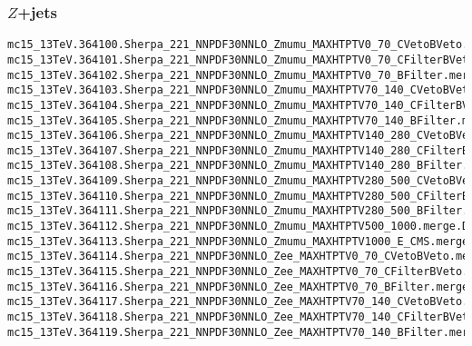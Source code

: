 \begin{scriptsize}
\subsubsection{$Z$+jets}
\tiny
\begin{verbatim}
mc15_13TeV.364100.Sherpa_221_NNPDF30NNLO_Zmumu_MAXHTPTV0_70_CVetoBVeto.merge.DAOD_HIGG5D2.e5271_s2726_r7772_r7676_p2949
mc15_13TeV.364101.Sherpa_221_NNPDF30NNLO_Zmumu_MAXHTPTV0_70_CFilterBVeto.merge.DAOD_HIGG5D2.e5271_s2726_r7772_r7676_p2949
mc15_13TeV.364102.Sherpa_221_NNPDF30NNLO_Zmumu_MAXHTPTV0_70_BFilter.merge.DAOD_HIGG5D2.e5271_s2726_r7772_r7676_p2949
mc15_13TeV.364103.Sherpa_221_NNPDF30NNLO_Zmumu_MAXHTPTV70_140_CVetoBVeto.merge.DAOD_HIGG5D2.e5271_s2726_r7772_r7676_p2949
mc15_13TeV.364104.Sherpa_221_NNPDF30NNLO_Zmumu_MAXHTPTV70_140_CFilterBVeto.merge.DAOD_HIGG5D2.e5271_s2726_r7772_r7676_p2949
mc15_13TeV.364105.Sherpa_221_NNPDF30NNLO_Zmumu_MAXHTPTV70_140_BFilter.merge.DAOD_HIGG5D2.e5271_s2726_r7772_r7676_p2949
mc15_13TeV.364106.Sherpa_221_NNPDF30NNLO_Zmumu_MAXHTPTV140_280_CVetoBVeto.merge.DAOD_HIGG5D2.e5271_s2726_r7772_r7676_p2949
mc15_13TeV.364107.Sherpa_221_NNPDF30NNLO_Zmumu_MAXHTPTV140_280_CFilterBVeto.merge.DAOD_HIGG5D2.e5271_s2726_r7772_r7676_p2949
mc15_13TeV.364108.Sherpa_221_NNPDF30NNLO_Zmumu_MAXHTPTV140_280_BFilter.merge.DAOD_HIGG5D2.e5271_s2726_r7772_r7676_p2949
mc15_13TeV.364109.Sherpa_221_NNPDF30NNLO_Zmumu_MAXHTPTV280_500_CVetoBVeto.merge.DAOD_HIGG5D2.e5271_s2726_r7772_r7676_p2949
mc15_13TeV.364110.Sherpa_221_NNPDF30NNLO_Zmumu_MAXHTPTV280_500_CFilterBVeto.merge.DAOD_HIGG5D2.e5271_s2726_r7772_r7676_p2949
mc15_13TeV.364111.Sherpa_221_NNPDF30NNLO_Zmumu_MAXHTPTV280_500_BFilter.merge.DAOD_HIGG5D2.e5271_s2726_r7772_r7676_p2949
mc15_13TeV.364112.Sherpa_221_NNPDF30NNLO_Zmumu_MAXHTPTV500_1000.merge.DAOD_HIGG5D2.e5271_s2726_r7772_r7676_p2949
mc15_13TeV.364113.Sherpa_221_NNPDF30NNLO_Zmumu_MAXHTPTV1000_E_CMS.merge.DAOD_HIGG5D2.e5271_s2726_r7772_r7676_p2949
mc15_13TeV.364114.Sherpa_221_NNPDF30NNLO_Zee_MAXHTPTV0_70_CVetoBVeto.merge.DAOD_HIGG5D2.e5299_s2726_r7772_r7676_p2949
mc15_13TeV.364115.Sherpa_221_NNPDF30NNLO_Zee_MAXHTPTV0_70_CFilterBVeto.merge.DAOD_HIGG5D2.e5299_s2726_r7772_r7676_p2949
mc15_13TeV.364116.Sherpa_221_NNPDF30NNLO_Zee_MAXHTPTV0_70_BFilter.merge.DAOD_HIGG5D2.e5299_s2726_r7772_r7676_p2949
mc15_13TeV.364117.Sherpa_221_NNPDF30NNLO_Zee_MAXHTPTV70_140_CVetoBVeto.merge.DAOD_HIGG5D2.e5299_s2726_r7772_r7676_p2949
mc15_13TeV.364118.Sherpa_221_NNPDF30NNLO_Zee_MAXHTPTV70_140_CFilterBVeto.merge.DAOD_HIGG5D2.e5299_s2726_r7772_r7676_p2949
mc15_13TeV.364119.Sherpa_221_NNPDF30NNLO_Zee_MAXHTPTV70_140_BFilter.merge.DAOD_HIGG5D2.e5299_s2726_r7772_r7676_p2949

\end{verbatim}
\end{scriptsize}
